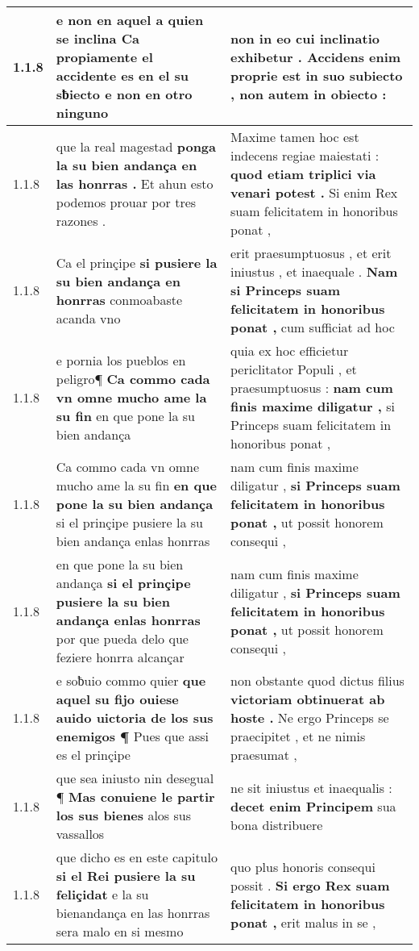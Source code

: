 \begin{tabular}{|p{1cm}|p{6.5cm}|p{6.5cm}|}
1.1.8 & e non en aquel a quien se inclina \textbf{ Ca propiamente el accidente es en el su sƀiecto } e non en otro ninguno & non in eo cui inclinatio exhibetur . \textbf{ Accidens enim proprie est in suo subiecto , } non autem in obiecto : \\\hline
1.1.8 & que la real magestad \textbf{ ponga la su bien andança en las honrras . } Et ahun esto podemos prouar por tres razones . & Maxime tamen hoc est indecens regiae maiestati : \textbf{ quod etiam triplici via venari potest . } Si enim Rex suam felicitatem in honoribus ponat , \\\hline
1.1.8 & Ca el prinçipe \textbf{ si pusiere la su bien andança en honrras } conmoabaste acanda vno & erit praesumptuosus , et erit iniustus , et inaequale . \textbf{ Nam si Princeps suam felicitatem in honoribus ponat , } cum sufficiat ad hoc \\\hline
1.1.8 & e pornia los pueblos en peligro¶ \textbf{ Ca commo cada vn omne mucho ame la su fin } en que pone la su bien andança & quia ex hoc efficietur periclitator Populi , et praesumptuosus : \textbf{ nam cum finis maxime diligatur , } si Princeps suam felicitatem in honoribus ponat , \\\hline
1.1.8 & Ca commo cada vn omne mucho ame la su fin \textbf{ en que pone la su bien andança } si el prinçipe pusiere la su bien andança enlas honrras & nam cum finis maxime diligatur , \textbf{ si Princeps suam felicitatem in honoribus ponat , } ut possit honorem consequi , \\\hline
1.1.8 & en que pone la su bien andança \textbf{ si el prinçipe pusiere la su bien andança enlas honrras } por que pueda delo que feziere honrra alcançar & nam cum finis maxime diligatur , \textbf{ si Princeps suam felicitatem in honoribus ponat , } ut possit honorem consequi , \\\hline
1.1.8 & e soƀuio commo quier \textbf{ que aquel su fijo ouiese auido uictoria de los sus enemigos ¶ } Pues que assi es el prinçipe & non obstante quod dictus filius \textbf{ victoriam obtinuerat ab hoste . } Ne ergo Princeps se praecipitet , et ne nimis praesumat , \\\hline
1.1.8 & que sea iniusto nin desegual ¶ \textbf{ Mas conuiene le partir los sus bienes } alos sus vassallos & ne sit iniustus et inaequalis : \textbf{ decet enim Principem } sua bona distribuere \\\hline
1.1.8 & que dicho es en este capitulo \textbf{ si el Rei pusiere la su feliçidat } e la su bienandança en las honrras sera malo en si mesmo & quo plus honoris consequi possit . \textbf{ Si ergo Rex suam felicitatem in honoribus ponat , } erit malus in se , \\\hline

\end{tabular}
